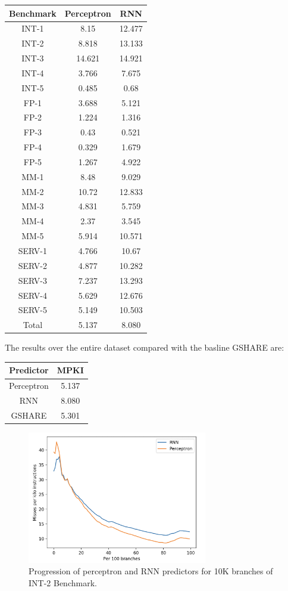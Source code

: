 \documentclass{article}
\begin{document}
\begin{center}
\begin{tabular}{ |c|c|c| } 
 \hline
 Benchmark & Perceptron & RNN \\
 \hline
INT-1 & 8.15 & 12.477 \\
INT-2 & 8.818 & 13.133 \\
INT-3 & 14.621 & 14.921 \\
INT-4 & 3.766 & 7.675 \\
INT-5 & 0.485 & 0.68 \\
FP-1 & 3.688 & 5.121 \\
FP-2 & 1.224 & 1.316 \\
FP-3 & 0.43 & 0.521 \\
FP-4 & 0.329 & 1.679 \\
FP-5 & 1.267 & 4.922 \\
MM-1 & 8.48 & 9.029 \\
MM-2 & 10.72 & 12.833 \\
MM-3 & 4.831 & 5.759 \\
MM-4 & 2.37 & 3.545 \\
MM-5 & 5.914 & 10.571 \\
SERV-1 & 4.766 & 10.67 \\
SERV-2 & 4.877 & 10.282 \\
SERV-3 & 7.237 & 13.293 \\
SERV-4 & 5.629 & 12.676 \\
SERV-5 & 5.149 & 10.503 \\
\hline
Total & 5.137 & 8.080 \\
 \hline
\end{tabular}
\end{center}

The results over the entire dataset compared with the basline GSHARE are:

\begin{center}
\begin{tabular}{ |c|c| } 
 \hline
 Predictor & MPKI \\
 \hline
Perceptron & 5.137 \\
RNN & 8.080 \\
GSHARE & 5.301 \\
 \hline
\end{tabular}
\end{center}

\begin{figure}
  \centering
  \includegraphics[width=0.7\textwidth]{comparision.png}
  \caption{Progression of perceptron and RNN predictors for 10K branches of INT-2 Benchmark.}
  \label{fig:comparision}
\end{figure}
\end{document}

